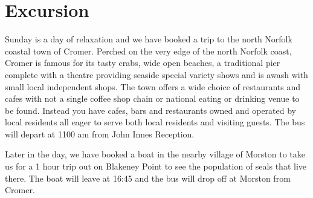 \documentclass[12pt,]{book}
\begin{document}
\section*{Excursion}\label{excursion}

Sunday is a day of relaxation and we have booked a trip to the north
Norfolk coastal town of Cromer. Perched on the very edge of the north
Norfolk coast, Cromer is famous for its tasty crabs, wide open beaches,
a traditional pier complete with a theatre providing seaside special
variety shows and is awash with small local independent shops. The town
offers a wide choice of restaurants and cafes with not a single coffee
shop chain or national eating or drinking venue to be found. Instead you
have cafes, bars and restaurants owned and operated by local residents
all eager to serve both local residents and visiting guests. The bus
will depart at 1100 am from John Innes Reception.

Later in the day, we have booked a boat in the nearby village of Morston
to take us for a 1 hour trip out on Blakeney Point to see the population
of seals that live there. The boat will leave at 16:45 and the bus will
drop off at Morston from Cromer.


\end{document}
